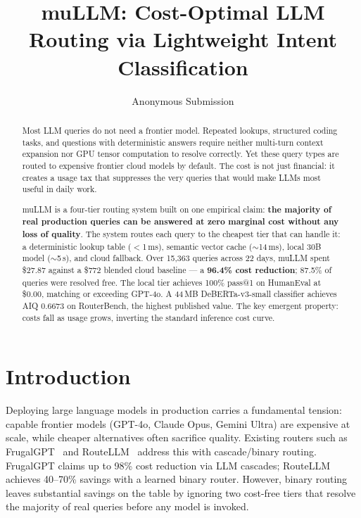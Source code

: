 \documentclass[11pt]{article}
\title{muLLM: Cost-Optimal LLM Routing via Lightweight Intent Classification}
\author{Anonymous Submission}
\begin{document}
\maketitle

\begin{abstract}
Most LLM queries do not need a frontier model. Repeated lookups,
structured coding tasks, and questions with deterministic answers require
neither multi-turn context expansion nor GPU tensor computation to
resolve correctly. Yet these query types are routed to expensive frontier
cloud models by default. The cost is not just financial: it creates a
usage tax that suppresses the very queries that would make LLMs most
useful in daily work.

muLLM is a four-tier routing system built on one empirical claim:
\textbf{the majority of real production queries can be answered at zero
marginal cost without any loss of quality}. The system routes each query
to the cheapest tier that can handle it: a deterministic lookup table
($<$1\,ms), semantic vector cache ($\sim$14\,ms), local 30B model
($\sim$5\,s), and cloud fallback. Over 15,363 queries across 22 days,
muLLM spent \$27.87 against a \$772 blended cloud baseline --- a
\textbf{96.4\% cost reduction}; 87.5\% of queries were resolved free.
The local tier achieves 100\% pass@1 on HumanEval at \$0.00, matching
or exceeding GPT-4o. A 44\,MB DeBERTa-v3-small classifier achieves AIQ
0.6673 on RouterBench, the highest published value. The key emergent
property: costs fall as usage grows, inverting the standard inference
cost curve.
\end{abstract}

\section{Introduction}

Deploying large language models in production carries a fundamental
tension: capable frontier models (GPT-4o, Claude Opus, Gemini Ultra) are
expensive at scale, while cheaper alternatives often sacrifice quality.
Existing routers such as FrugalGPT~\cite{chen2023frugalgpt} and
RouteLLM~\cite{ong2024routellm} address this with cascade/binary
routing. FrugalGPT claims up to 98\% cost reduction via LLM cascades;
RouteLLM achieves 40--70\% savings with a learned binary router. However,
binary routing leaves substantial savings on the table by ignoring two
cost-free tiers that resolve the majority of real queries before any
model is invoked.
\end{document}

